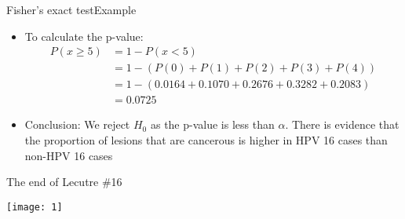 \documentclass[xcolor=dvipsnames]{beamer}
\begin{document}
\begin{frame}{Fisher's exact test}{Example}
	\begin{itemize}
		\item To calculate the p-value:  \pause
		\begin{align*}
			P(x \geq 5) &= 1-P(x < 5) \\
			&=1-(P(0) + P(1) + P(2) + P(3) + P(4)) \\ 
			&=1-(0.0164 + 0.1070 + 0.2676 + 0.3282 + 0.2083)  \\
			&=0.0725
		\end{align*}  \pause
		\item Conclusion: We reject $H_0$ as the p-value is less than $\alpha$. There is evidence that the proportion of lesions that are cancerous is higher in HPV 16 cases than non-HPV 16 cases
	\end{itemize}
\end{frame}

\begin{frame}{The end of Lecutre \#16}
	\begin{center}
		\texttt{[image: 1]}
	\end{center}
\end{frame}
\end{document}
